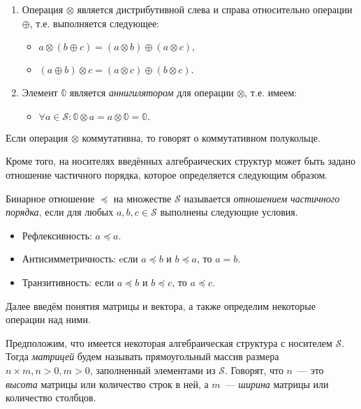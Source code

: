 \begin{definition}[Полукольцо]
\begin{enumerate}
\item Операция $\otimes$ является дистрибутивной слева и справа относительно операции $\oplus$, т.е. выполняется следующее:
\begin{itemize}
	\item $a \otimes (b \oplus c) = (a \otimes b) \oplus (a \otimes c),$
    \item $(a \oplus b) \otimes c = (a \otimes c) \oplus (b \otimes c).$
\end{itemize}


\item Элемент $\mathbb{0}$ является \textit{аннигилятором} для операции $\otimes$, т.е. имеем:
\begin{itemize}
	\item $\forall a \in \mathcal{S}: \mathbb{0} \otimes a = a \otimes \mathbb{0} = \mathbb{0}.$
\end{itemize}

\end{enumerate}

Если операция $\otimes$ коммутативна, то говорят о коммутативном полукольце.

\end{definition}

Кроме того, на носителях введённых алгебраических структур может быть задано отношение частичного порядка, которое определяется следующим образом.

\begin{definition}
Бинарное отношение $\preceq$ на множестве $\mathcal{S}$ называется \textit{отношением частичного порядка}, если для любых $a, b, c \in \mathcal{S}$ выполнены следующие условия.
\begin{itemize}
	\item Рефлексивность: $a \preceq a$.
    \item Антисимметричность: eсли $a \preceq b$ и $b \preceq a$, то $a = b$. 
    \item Транзитивность: если $a \preceq b$ и $b \preceq c$, то $a \preceq c$. 
\end{itemize}
\end{definition}

Далее введём понятия матрицы и вектора, а также определим некоторые операции над ними.

\begin{definition}[Матрица]
Предположим, что имеется некоторая алгебраическая структура с носителем $\mathcal{S}$. Тогда \emph{матрицей} будем называть прямоугольный массив размера $n\times m, n > 0, m > 0$, заполненный элементами из $\mathcal{S}$. Говорят, что $n$~--- это \emph{высота} матрицы или количество строк в ней, а $m$~--- \emph{ширина} матрицы или количество столбцов.
\end{definition}


